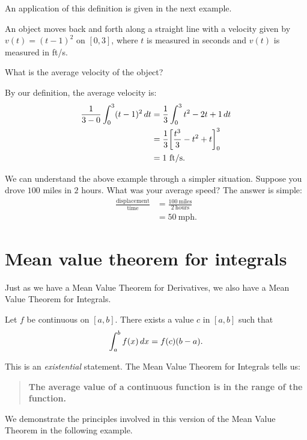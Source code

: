 \documentclass{ximera}
\begin{document}
An application of this definition is given in the next example.


\begin{example}
An object moves back and forth along a straight line with a velocity
given by $v(t) = (t-1)^2$ on $[0,3]$, where $t$ is measured in seconds
and $v(t)$ is measured in ft/s.

What is the average velocity of the object?
\begin{explanation}
By our definition, the average velocity is:
\begin{align*}
\frac{1}{3-0}\int_0^3 (t-1)^2\,d t &=\frac13 \int_0^3 t^2-2t+1\,d t\\
&= \frac13\bigg[ \frac{t^3}{3}-t^2+t \bigg]_0^3\\
&= 1\text{ ft/s}.
\end{align*}
\end{explanation}
\end{example}

We can understand the above example through a simpler
situation. Suppose you drove $100$ miles in $2$ hours. What was your
average speed? The answer is simple:
\begin{align*}
  \frac{\text{displacement}}{\text{time}} &= \frac{100~\text{miles}}{2~\text{hours}}\\
  &= 50~\text{mph.}
\end{align*}






\section{Mean value theorem for integrals}

Just as we have a Mean Value Theorem for Derivatives, we also have a
Mean Value Theorem for Integrals.


\begin{theorem}
Let $f$ be continuous on $[a,b]$. There exists a value $c$ in $[a,b]$
such that
\[
\int_a^bf(x)\,d x = f(c)(b-a).
\]
\end{theorem}

This is an \emph{existential} statement. The Mean Value Theorem for
Integrals tells us:
\begin{quote}
\textbf{The average value of a continuous function is in the range of
  the function.}
\end{quote}


We demonstrate the principles involved in this version of the Mean
Value Theorem in the following example.
\end{document}

